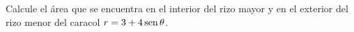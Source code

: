 \item Calcule el área que se encuentra en el interior del rizo mayor y en el exterior del rizo menor del caracol $r = 3 + 4 \operatorname{sen}\theta$.
